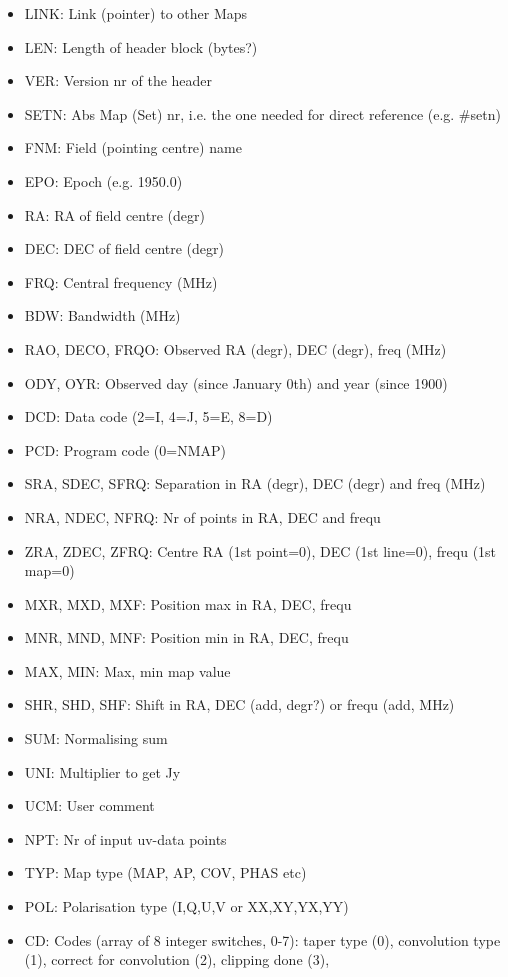 \begin{itemize} 
\item  LINK: Link (pointer) to other Maps 
\item  LEN: Length of header block (bytes?) 
\item  VER: Version nr of the header 
\item  SETN: Abs Map (Set) nr, i.e. the one needed for direct reference 
	(e.g. \#setn) 
\item  FNM: Field (pointing centre) name 
\item  EPO: Epoch (e.g. 1950.0) 
\item  RA: RA of field centre (degr) 
\item  DEC: DEC of field centre (degr) 
\item  FRQ: Central frequency (MHz) 
\item  BDW: Bandwidth (MHz) 
\item  RAO, DECO, FRQO: Observed RA (degr), DEC (degr), freq (MHz) 
\item  ODY, OYR: Observed day (since January 0th) and year (since 1900) 
\item  DCD: Data code (2=I, 4=J, 5=E, 8=D) 
\item  PCD: Program code (0=NMAP) 
\item  SRA, SDEC, SFRQ: Separation in RA (degr), DEC (degr) and freq (MHz) 
\item  NRA, NDEC, NFRQ: Nr of points in RA, DEC and frequ 
\item  ZRA, ZDEC, ZFRQ: Centre RA (1st point=0), DEC (1st line=0), frequ (1st
map=0) 
\item  MXR, MXD, MXF: Position max in RA, DEC, frequ 
\item  MNR, MND, MNF: Position min in RA, DEC, frequ 
\item  MAX, MIN: Max, min map value 
\item  SHR, SHD, SHF: Shift in RA, DEC (add, degr?) or frequ (add, MHz) 
\item  SUM: Normalising sum 
\item  UNI: Multiplier to get Jy 
\item  UCM: User comment 
\item  NPT: Nr of input uv-data points 
\item  TYP: Map type (MAP, AP, COV, PHAS etc) 
\item  POL: Polarisation type (I,Q,U,V or XX,XY,YX,YY) 
\item  CD: Codes (array of 8 integer switches, 0-7): 
	taper type (0), convolution type (1), 
	correct for convolution (2), clipping done (3), 

\end{itemize}
